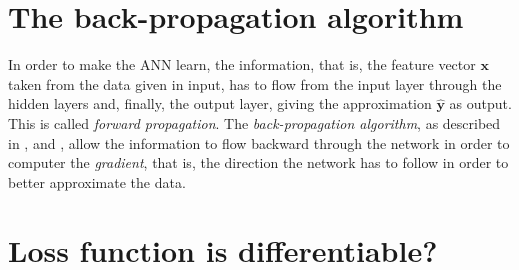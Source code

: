 	\section{The back-propagation algorithm} %
	\label{sec:the_back-propagation_algorithm}
		\noindent
		In order to make the ANN learn, the information, that is, the feature vector $\mathcal{\mathbf{x}}$ taken
		from the data given in input, has to flow from the input layer through the hidden layers and, finally, the
		output layer, giving the approximation $\hat{\mathbf{y}}$ as output. This is called \textit{forward
		propagation}. The \textit{back-propagation algorithm}, as described in \cite{Goodfellow-et-al-2016},
		\cite{haykin2009neural} and \cite{mitchell1997machine}, allow the information to flow backward through the
		network in order to computer the \textit{gradient}, that is, the direction the network has to follow in
		order to better approximate the data.

	\section{Loss function is differentiable?} %
	\label{sec:loss_function_is_differentiable_}


